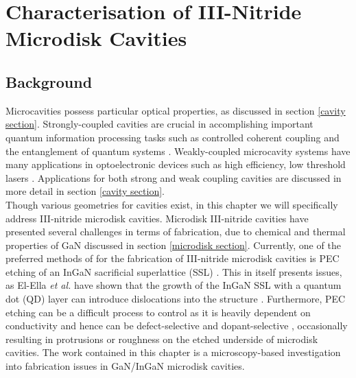 
\chapter{Characterisation of III-Nitride Microdisk Cavities}

\ifpdf
    \graphicspath{{Chapter2/Figs/Raster/}{Chapter2/Figs/PDF/}{Chapter2/Figs/}}
\else
    \graphicspath{{Chapter2/Figs/Vector/}{Chapter2/Figs/}}
\fi


\section[Short title]{Background}

Microcavities possess particular optical properties, as discussed in section \ref{cavity section}. Strongly-coupled cavities are crucial in accomplishing important quantum information processing tasks such as controlled coherent coupling and the entanglement of quantum systems \cite{Hennessy2007}. Weakly-coupled microcavity systems have many applications in optoelectronic devices such as high efficiency, low threshold lasers \cite{Vahala2003}. Applications for both strong and weak coupling cavities are discussed in more detail in section \ref{cavity section}.
\\ Though various geometries for cavities exist, in this chapter we will specifically address III-nitride microdisk cavities. Microdisk III-nitride cavities have presented several challenges in terms of fabrication, due to chemical and thermal properties of GaN discussed in section \ref{microdisk section}. Currently, one of the preferred methods of for the fabrication of III-nitride microdisk cavities is PEC etching of an InGaN sacrificial superlattice  (SSL) \cite{Puchtler2015}. This in itself presents issues, as El-Ella \textit{et al.} have shown that the growth of the InGaN SSL with a quantum dot (QD) layer can introduce dislocations into the structure \cite{El-Ella2011a}. Furthermore, PEC etching can be a difficult process to control as it is heavily dependent on conductivity and hence can be defect-selective \cite{Visconti2001,Youtsey1999,Youtsey1998} and dopant-selective \cite{Youtsey1999}, occasionally resulting in protrusions or roughness \cite{Puchtler2015} on the etched underside of microdisk cavities. The work contained in this chapter is a microscopy-based investigation into fabrication issues in GaN/InGaN microdisk cavities.

